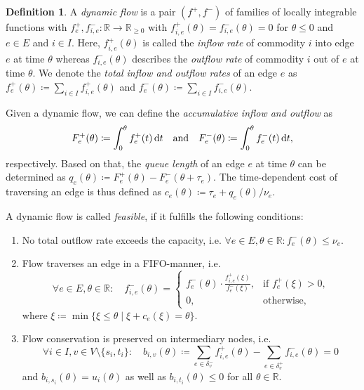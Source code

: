 \documentclass[titlepage]{scrartcl}
\theoremstyle{definition}
\newtheorem{definition}[theorem]{Definition}
\newcommand{\R}{\mathbb{R}}
\newcommand{\diff}{\,\textnormal{d}}
\newcommand{\capa}{\nu}
\newcommand{\transit}{\tau}
\newcommand{\outEdges}[1]{\delta^-_{#1}}
\newcommand{\inEdges}[1]{\delta^+_{#1}}
\newcommand{\infl}[1][f]{{#1}^+}
\newcommand{\outfl}[1][f]{{#1}^-}
\newcommand{\bal}[2]{b_{#1,#2}}
\newcommand{\qulen}{q}
\begin{document}
    
    \begin{definition}
        A \emph{dynamic flow} is a pair $(\infl, \outfl)$ of families of locally integrable functions with $\infl_e, \outfl_{i,e} : \R \rightarrow \R_{\geq 0}$ with $\infl_{i,e}(\theta) = \outfl_{i,e}(\theta) = 0$ for $\theta \leq 0$ and  $e\in E$ and $i\in I$.
        Here, $\infl_{i,e}(\theta)$ is called the \emph{inflow rate} of commodity $i$ into edge $e$ at time $\theta$ whereas $\outfl_{i,e}(\theta)$ describes the \emph{outflow rate} of commodity $i$ out of $e$ at time $\theta$.
        We denote the \emph{total inflow and outflow rates} of an edge $e$ as $\infl_e(\theta) \coloneqq \sum_{i\in I} \infl_{i,e}(\theta)$ and $\outfl_e(\theta) \coloneqq \sum_{i\in I}\outfl_{i,e}(\theta)$.

        Given a dynamic flow, we can define the \emph{accumulative inflow and outflow} as
        \[
            F^+_e(\theta) \coloneqq \int_0^\theta \infl_e(t) \diff t \quad\text{and}\quad  F^-_e(\theta) \coloneqq \int_0^\theta \outfl_e(t) \diff t,
        \]
        respectively.
        Based on that, the \emph{queue length} of an edge $e$ at time $\theta$ can be determined as $\qulen_e(\theta) \coloneqq F^+_e(\theta) - F^-_e(\theta + \transit_e)$.
        The time-dependent cost of traversing an edge is thus defined as $c_e(\theta) \coloneqq \transit_e + \qulen_e(\theta) / \capa_e$.

        A dynamic flow is called \emph{feasible}, if it fulfills the following conditions:
        \begin{enumerate}[label=(F\arabic*)]
            \item No total outflow rate exceeds the capacity, i.e. $\forall e\in E, \theta\in\R: \outfl_e(\theta)\leq \capa_e$.
            \item Flow traverses an edge in a FIFO-manner, i.e. \[
                \forall e\in E, \theta\in\R: \quad 
                \outfl_{i,e}(\theta) = \begin{cases}
                 \outfl_e(\theta) \cdot \frac{\infl_{i,e}(\xi)}{\outfl_e(\xi)}, & \text{if $\infl_e(\xi) > 0$,}\\
                 0, & \text{otherwise,}
            \end{cases}
            \]
            where $\xi\coloneqq \min \{ \xi \leq \theta  \mid \xi + c_e(\xi) = \theta \}$. 
            \item Flow conservation is preserved on intermediary nodes, i.e. \[\forall i\in I, v\in V\setminus\{ s_i, t_i \}: \quad
            \bal{i}{v}(\theta)\coloneqq \sum_{e\in\outEdges{v}}\infl_{i,e}(\theta) - \sum_{e\in\inEdges{v}} \outfl_{i,e}(\theta) = 0 \]
            and $\bal{i}{s_i}(\theta) = u_i(\theta)$ as well as $\bal{i}{t_i}(\theta) \leq 0$ for all $\theta\in\R$.


\end{enumerate}
\end{definition}
\end{document}
